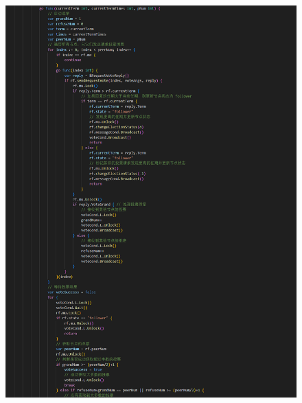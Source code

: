 \documentclass[]{article}
\begin{document}
\begin{itemize}
\begin{figure}[H]
			\includegraphics[height=1\textheight]{./2A/ticker2.png}
		\end{figure}
		\begin{figure}[H]
			\centering

\end{figure}
\end{itemize}
\end{document}
